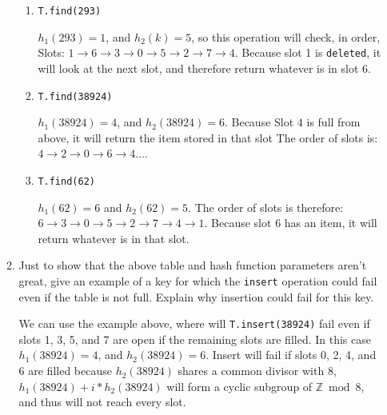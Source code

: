 \documentclass[11pt]{article}
\begin{document}
\begin{enumerate}
\begin{enumerate}
\begin{enumerate}
\item
\begin{verbatim}
T.find(293)
\end{verbatim}
$h_1(293) = 1$, and $h_2(k) = 5$, so this operation will check, in order, Slots: $1 \to 6 \to 3 \to 0 \to 5 \to 2 \to 7 \to 4$.  Because slot 1 is \texttt{deleted}, it will look at the next slot, and therefore return whatever is in slot $6$.
\item
\begin{verbatim}
T.find(38924)
\end{verbatim}
$h_1(38924) = 4$, and $h_2(38924) = 6$.  Because Slot $4$ is full from above, it will return the item stored in that slot  The order of slots is: $4 \to 2 \to 0 \to 6 \to 4...$.
\item
\begin{verbatim}
T.find(62)
\end{verbatim}
$h_1(62) = 6$ and $h_2(62) = 5$.  The order of slots is therefore: $6 \to 3 \to 0 \to 5 \to 2 \to 7 \to 4 \to 1$.  Because slot $6$ has an item, it will return whatever is in that slot.
\end{enumerate}
\item
Just to show that the above table and hash function parameters aren't
great, give an example of a key for which the \texttt{insert} operation
could fail even if the table is not full.  Explain why insertion could
fail for this key.

We can use the example above, where will \texttt{T.insert(38924)} fail even if slots 1, 3, 5, and 7 are open if the remaining slots are filled.  In this case $h_1(38924) = 4$, and $h_2(38924) = 6$.  Insert will fail if slots 0, 2, 4, and 6 are filled because $h_2(38924)$ shares a common divisor with $8$, $h_1(38924) + i*h_2(38924)$ will form a cyclic subgroup of $\mathbb{Z}\bmod8$, and thus will not reach every slot.
\end{enumerate}
\end{enumerate}
\end{document}

